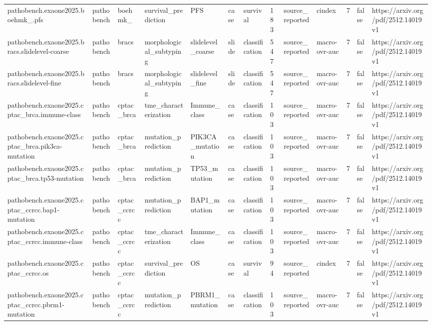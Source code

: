 \begin{longtable}{lllllllllllll}
pathobench.exaone2025.boehmk\_.pfs & pathobench & boehmk\_ & survival\_prediction & PFS & case & survival & 183 & source\_reported & cindex & 7 & false & https://arxiv.org/pdf/2512.14019v1 \\
pathobench.exaone2025.bracs.slidelevel-coarse & pathobench & bracs & morphological\_subtyping & slidelevel\_coarse & slide & classification & 547 & source\_reported & macro-ovr-auc & 7 & false & https://arxiv.org/pdf/2512.14019v1 \\
pathobench.exaone2025.bracs.slidelevel-fine & pathobench & bracs & morphological\_subtyping & slidelevel\_fine & slide & classification & 547 & source\_reported & macro-ovr-auc & 7 & false & https://arxiv.org/pdf/2512.14019v1 \\
pathobench.exaone2025.cptac\_brca.immune-class & pathobench & cptac\_brca & tme\_characterization & Immune\_class & case & classification & 103 & source\_reported & macro-ovr-auc & 7 & false & https://arxiv.org/pdf/2512.14019v1 \\
pathobench.exaone2025.cptac\_brca.pik3ca-mutation & pathobench & cptac\_brca & mutation\_prediction & PIK3CA\_mutation & case & classification & 103 & source\_reported & macro-ovr-auc & 7 & false & https://arxiv.org/pdf/2512.14019v1 \\
pathobench.exaone2025.cptac\_brca.tp53-mutation & pathobench & cptac\_brca & mutation\_prediction & TP53\_mutation & case & classification & 103 & source\_reported & macro-ovr-auc & 7 & false & https://arxiv.org/pdf/2512.14019v1 \\
pathobench.exaone2025.cptac\_ccrcc.bap1-mutation & pathobench & cptac\_ccrcc & mutation\_prediction & BAP1\_mutation & case & classification & 103 & source\_reported & macro-ovr-auc & 7 & false & https://arxiv.org/pdf/2512.14019v1 \\
pathobench.exaone2025.cptac\_ccrcc.immune-class & pathobench & cptac\_ccrcc & tme\_characterization & Immune\_class & case & classification & 103 & source\_reported & macro-ovr-auc & 7 & false & https://arxiv.org/pdf/2512.14019v1 \\
pathobench.exaone2025.cptac\_ccrcc.os & pathobench & cptac\_ccrcc & survival\_prediction & OS & case & survival & 94 & source\_reported & cindex & 7 & false & https://arxiv.org/pdf/2512.14019v1 \\
pathobench.exaone2025.cptac\_ccrcc.pbrm1-mutation & pathobench & cptac\_ccrcc & mutation\_prediction & PBRM1\_mutation & case & classification & 103 & source\_reported & macro-ovr-auc & 7 & false & https://arxiv.org/pdf/2512.14019v1 \\

\end{longtable}
